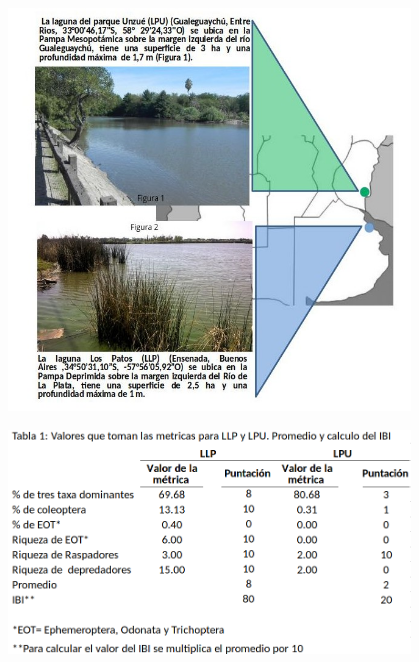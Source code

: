 \documentclass[final]{beamer}
\newlength{\sepwid}
\newlength{\onecolwid}
\begin{document}
\begin{frame}[t]
\begin{columns}[t]
                  
                  
         \begin{column}{\sepwid}  \end{column}
         
         
         
         
         \begin{column}{\onecolwid} %
         
        
         \begin{figure}
                  \includegraphics[width=.75\linewidth]{area_estudio.jpg}
				\end{figure}
				
				\begin{figure}
                  \includegraphics[width=.8\linewidth]{ibi.png}
				\end{figure}
				

\end{column}
\end{columns}
\end{frame}
\end{document}
